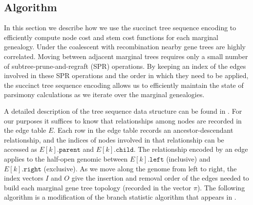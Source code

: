 \subsection{Algorithm}

In this section we describe how we use the succinct tree sequence encoding
\cite{Kelleher_etal_2016} to efficiently compute node cost and stem cost 
functions for each marginal genealogy. Under the coalescent with recombination 
nearby gene trees are highly correlated. Moving between adjacent marginal trees 
requires only a small number of subtree-prune-and-regraft (SPR) operations. By 
keeping an index of the edges involved in these SPR operations and the order in 
which they need to be applied, the succinct tree sequence encoding allows us to 
efficiently maintain the state of parsimony calculations as we iterate over the 
marginal genealogies.

A detailed description of the tree sequence data structure can be found in
\cite{Kelleher_etal_2016}. For our purposes it suffices to know that
relationships among nodes are recorded in the edge table $E$. Each row in the
edge table records an ancestor-descendant relationship, and the indices of nodes
involved in that relationship can be accessed as $E[k].\texttt{parent}$ and 
$E[k].\texttt{child}$. The relationship encoded by an edge applies to the
half-open genomic between $E[k].\texttt{left}$ (inclusive) and
$E[k].\texttt{right}$ (exclusive). As we move along the genome from left to
right, the index vectors $I$ and $O$ give the insertion and
removal order of the edges needed to build each marginal gene tree topology 
(recorded in the vector $\pi$). The following algorithm is a modification of
the branch statistic algorithm that appears in \cite{Ralph_etal_2020}.

